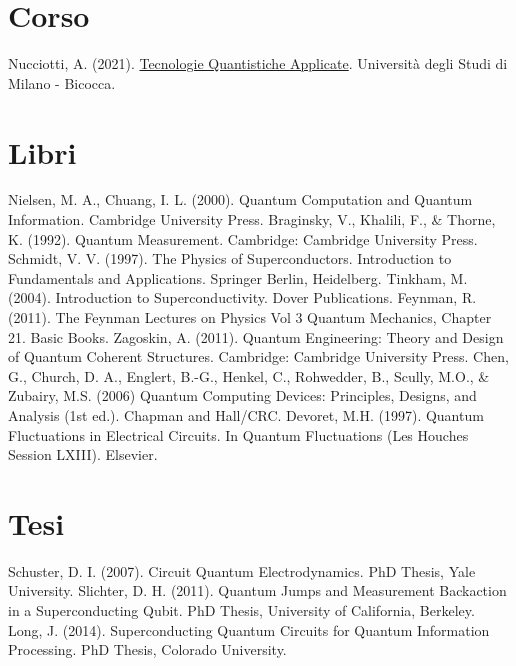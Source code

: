 \begin{thebibliography}{12}
\section*{Corso}
Nucciotti, A. (2021). \href{https://elearning.unimib.it/course/view.php?id=39133}{Tecnologie Quantistiche Applicate}. Università degli Studi di Milano - Bicocca.
\section*{Libri}
Nielsen, M. A., Chuang, I. L. (2000). Quantum Computation and Quantum Information. Cambridge University Press.
Braginsky, V., Khalili, F., \& Thorne, K. (1992). Quantum Measurement. Cambridge: Cambridge University Press.
Schmidt, V. V. (1997). The Physics of Superconductors. Introduction to Fundamentals and Applications. Springer Berlin, Heidelberg.
Tinkham, M. (2004). Introduction to Superconductivity. Dover Publications.
Feynman, R. (2011). The Feynman Lectures on Physics Vol 3 Quantum Mechanics, Chapter 21. Basic Books.
Zagoskin, A. (2011). Quantum Engineering: Theory and Design of Quantum Coherent Structures. Cambridge: Cambridge University Press.
Chen, G., Church, D. A., Englert, B.-G., Henkel, C., Rohwedder, B., Scully, M.O., \& Zubairy, M.S. (2006)
Quantum Computing Devices: Principles, Designs, and Analysis (1st ed.). Chapman and Hall/CRC.
Devoret, M.H. (1997). Quantum Fluctuations in Electrical Circuits. In Quantum Fluctuations (Les Houches Session LXIII). Elsevier.

\section*{Tesi}
Schuster, D. I. (2007). Circuit Quantum Electrodynamics. PhD Thesis, Yale University.
Slichter, D. H. (2011). Quantum Jumps and Measurement Backaction in a Superconducting Qubit. PhD Thesis, University of California, Berkeley.
Long, J. (2014). Superconducting Quantum Circuits for Quantum Information Processing. PhD Thesis, Colorado University.


\end{thebibliography}
